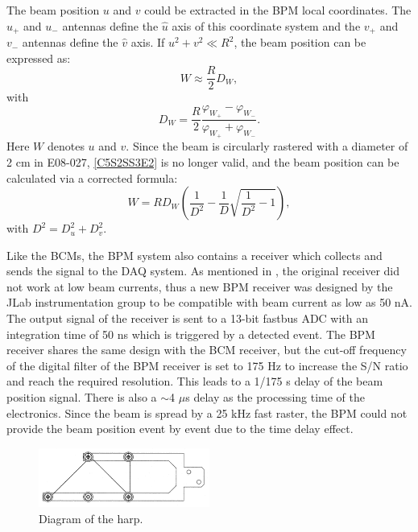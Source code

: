 The beam position $u$ and $v$ could be extracted in the BPM local coordinates. The $u_+$ and $u_-$ antennas define the $\hat{u}$ axis of this coordinate system and the $v_+$ and $v_-$ antennas define the $\hat{v}$ axis. If $u^2+v^2\ll R^2$, the beam position can be expressed as:
\begin{equation} \label{C5S2SS3E2}
W \approx \frac{R}{2}D_W,
\end{equation}
with
\begin{equation} \label{C5S2SS3E3}
D_W= \frac{R}{2}\frac{\varphi_{W_+}-\varphi_{W_-}}{\varphi_{W_+}+\varphi_{W_-}}.
\end{equation}
Here $W$ denotes $u$ and $v$. Since the beam is circularly rastered with a diameter of 2 cm in E08-027, \cref{C5S2SS3E2} is no longer valid, and the beam position can be calculated via a corrected formula:
\begin{equation} \label{C5S2SS3E4}
W = RD_W\left(\frac{1}{D^2}-\frac{1}{D}\sqrt{\frac{1}{D^2}-1}\right),
\end{equation}
with $D^2=D_u^2+D_v^2$.

Like the BCMs, the BPM system also contains a receiver which collects and sends the signal to the DAQ system. As mentioned in , the original receiver did not work at low beam currents, thus a new BPM receiver was designed by the JLab instrumentation group \cite{Musson2012} to be compatible with beam current as low as 50 nA. The output signal of the receiver is sent to a 13-bit fastbus ADC with an integration time of 50 ns which is triggered by a detected event. The BPM receiver shares the same design with the BCM receiver, but the cut-off frequency of the digital filter of the BPM receiver is set to 175 Hz to increase the S/N ratio and reach the required resolution. This leads to a 1/175 s delay of the beam position signal. There is also a $\sim$4 $\mu$s delay as the processing time of the electronics. Since the beam is spread by a 25 kHz fast raster, the BPM could not provide the beam position event by event due to the time delay effect.

\begin{figure}[b!]
  \centering
  \includegraphics[width=0.5\textwidth]{figs/harp.png}
  \caption[Diagram of the harp.]{Diagram of the harp. \label{C5S2SS3F2}}
\end{figure}

